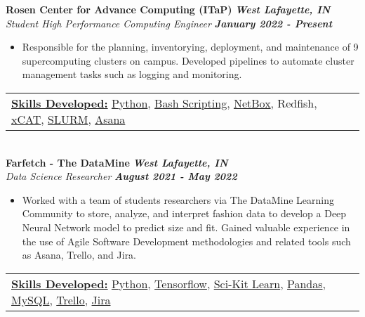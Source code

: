\documentclass[a4paper]{article}
\begin{document}
\textbf{Rosen Center for Advance Computing (ITaP)} \hfill \textbf{\textit {West Lafayette, IN}}\\
\textit{Student High Performance Computing Engineer} \hfill \textbf{\textit {January 2022 - Present}}\\
\vspace{-1mm}
\begin{itemize} \itemsep 1pt
	\item Responsible for the planning, inventorying, deployment, and maintenance of 9 supercomputing clusters on campus.
    Developed pipelines to automate cluster management tasks such as logging and monitoring. 
\end{itemize}
\begin{tabular}{ l l }
    \underline{\textbf {Skills Developed:}} \href{https://www.python.org/}{Python}, \href{https://www.gnu.org/software/bash/}{Bash Scripting}, \href{https://docs.netbox.dev/en/stable/}{NetBox}, Redfish, \href{https://xcat.org/}{xCAT}, \href{https://slurm.schedmd.com/overview.html}{SLURM}, \href{https://asana.com/}{Asana} 
\end{tabular} \\ 
\vspace{1mm}
\textbf{Farfetch - The DataMine} \hfill \textbf{\textit {West Lafayette, IN}}\\
\textit{Data Science Researcher} \hfill \textbf{\textit {August 2021 - May 2022}}\\
\vspace{-1mm}
\begin{itemize} \itemsep 1pt
	\item Worked with a team of students researchers via The DataMine Learning Community to store, analyze, and interpret fashion data to develop a Deep Neural Network model to predict size and fit.
    Gained valuable experience in the use of Agile Software Development methodologies and related tools such as Asana, Trello, and Jira.
\end{itemize}
\vspace{-1mm}
\begin{tabular}{ l l }
    \underline{\textbf {Skills Developed:}} \href{https://www.python.org/}{Python}, \href{https://www.tensorflow.org/}{Tensorflow}, \href{https://scikit-learn.org/stable/index.html}{Sci-Kit Learn}, \href{https://pandas.pydata.org/}{Pandas}, \href{https://www.mysql.com/}{MySQL}, \href{https://trello.com/}{Trello}, \href{https://jira.atlassian.com/}{Jira}
\end{tabular} \\ 
\vspace{2mm}
\end{document}
